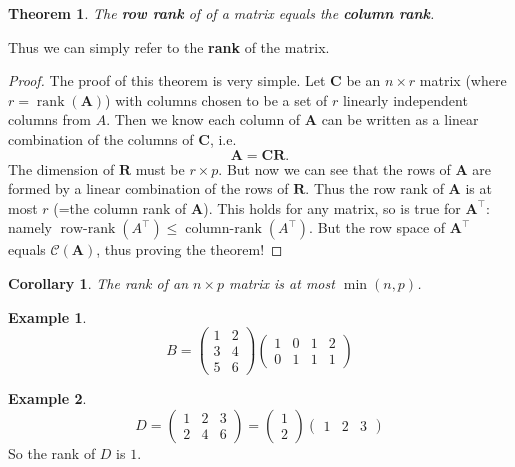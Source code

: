 \documentclass[]{book}
\newtheorem{theorem}{Theorem}[chapter]
\newtheorem{corollary}{Corollary}[chapter]
\theoremstyle{definition}
\theoremstyle{definition}
\newtheorem{example}{Example}[chapter]
\theoremstyle{definition}
\theoremstyle{remark}
\begin{document}
\begin{theorem}
\protect\hypertarget{thm:rowrank}{}{\label{thm:rowrank} }The \textbf{row rank} of of a matrix equals the \textbf{column rank}.
\end{theorem}

Thus we can simply refer to the \textbf{rank} of the matrix.

\begin{proof}
{}The proof of this theorem is very simple. Let \(\boldsymbol C\) be an \(n \times r\) matrix (where \(r=\operatorname{rank}(\boldsymbol A)\)) with columns chosen to be a set of \(r\) linearly independent columns from \(A\). Then we know each column of \(\boldsymbol A\) can be written as a linear combination of the columns of \(\boldsymbol C\), i.e.
\[\boldsymbol A= \boldsymbol C\boldsymbol R.\]
The dimension of \(\boldsymbol R\) must be \(r \times p\). But now we can see that the rows of \(\boldsymbol A\) are formed by a linear combination of the rows of \(\boldsymbol R\). Thus the row rank of \(\boldsymbol A\) is at most \(r\) (=the column rank of \(\boldsymbol A\)). This holds for any matrix, so is true for \(\boldsymbol A^\top\): namely \(\operatorname{row-rank}(A^\top)\leq \operatorname{column-rank}(A^\top)\). But the row space of \(\boldsymbol A^\top\) equals \(\mathcal{C}(\boldsymbol A)\), thus proving the theorem!
\end{proof}

\begin{corollary}
\protect\hypertarget{cor:unnamed-chunk-2}{}{\label{cor:unnamed-chunk-2} }The rank of an \(n\times p\) matrix is at most \(\min(n,p)\).
\end{corollary}

\begin{example}
\protect\hypertarget{exm:matrix1}{}{\label{exm:matrix1} }\[B = \left( \begin{array}{cccc} 1 & 2\\ 3&4 \\5&6\end{array}\right)\left(\begin{array}{cccc}1&0&1&2\\0&1&1&1\end{array}\right)
\]
\end{example}

\begin{example}
\protect\hypertarget{exm:matrix2}{}{\label{exm:matrix2} }\[ D=\left( \begin{array}{ccc} 1 & 2&3\\ 2&4&6 \end{array}\right)= \left( \begin{array}{c} 1 \\ 2 \end{array}\right)\left(\begin{array}{ccc}1&2&3\end{array}\right)
\]
So the rank of \(D\) is \(1\).
\end{example}
\end{document}
